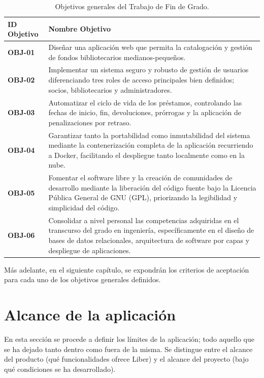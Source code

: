 \begin{table}[H]
	\centering
	\caption{Objetivos generales del Trabajo de Fin de Grado.}
	\label{tab:objetivos_generales}
	\begin{tabularx}{\textwidth}{l X}
		\toprule
		\textbf{ID Objetivo} & \textbf{Nombre Objetivo} \\
		\midrule
		\textbf{OBJ-01} & Diseñar una aplicación web que permita la catalogación y gestión de fondos bibliotecarios medianos-pequeños. \\
		\addlinespace
		\textbf{OBJ-02} & Implementar un sistema seguro y robusto de gestión de usuarios diferenciando tres roles de acceso principales bien definidos; socios, bibliotecarios y administradores. \\
		\addlinespace
		\textbf{OBJ-03} & Automatizar el ciclo de vida de los préstamos, controlando las fechas de inicio, fin, devoluciones, prórrogas y la aplicación de penalizaciones por retraso. \\
		\addlinespace
		\textbf{OBJ-04} & Garantizar tanto la portabilidad como inmutabilidad del sistema mediante la contenerización completa de la aplicación recurriendo a Docker, facilitando el despliegue tanto localmente como en la nube. \\
		\addlinespace
		\textbf{OBJ-05} & Fomentar el software libre y la creación de comunidades de desarrollo mediante la liberación del código fuente bajo la Licencia Pública General de GNU (GPL), priorizando la legibilidad y simplicidad del código. \\
		\addlinespace
		\textbf{OBJ-06} & Consolidar a nivel personal las competencias adquiridas en el transcurso del grado en ingeniería, específicamente en el diseño de bases de datos relacionales, arquitectura de software por capas y despliegue de aplicaciones. \\
		\bottomrule
	\end{tabularx}
\end{table}


Más adelante, en el siguiente capítulo, se expondrán los criterios de aceptación para cada uno de los objetivos generales definidos.


\section{Alcance de la aplicación}
En esta sección se procede a definir los límites de la aplicación; todo aquello 
que se ha dejado tanto dentro como fuera de la misma. Se distingue entre el 
alcance del producto (qué funcionalidades ofrece Liber) y el alcance del 
proyecto (bajo qué condiciones se ha desarrollado).

